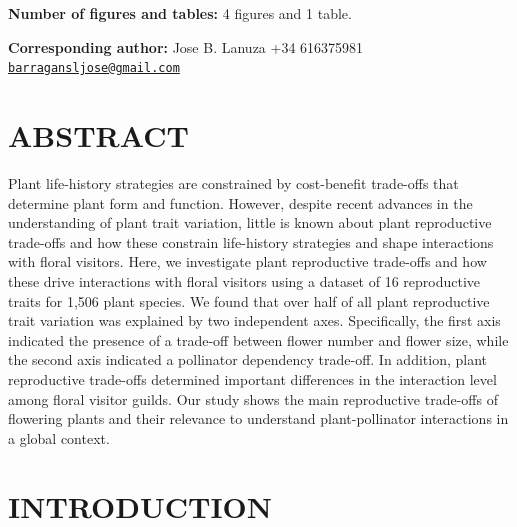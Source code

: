 \documentclass[
  12pt,
  a4paper,
]{article}
\begin{document}
\textbf{Number of figures and tables:} 4 figures and 1 table.

\textbf{Corresponding author:} Jose B. Lanuza \textbar{} +34 616375981\textbar{} \href{mailto:barragansljose@gmail.com}{\nolinkurl{barragansljose@gmail.com}}

\newpage

\hypertarget{abstract}{%
\section{ABSTRACT}\label{abstract}}

Plant life-history strategies are constrained by cost-benefit trade-offs that determine plant form and function. However, despite recent advances in the understanding of plant trait variation, little is known about plant reproductive trade-offs and how these constrain life-history strategies and shape interactions with floral visitors. Here, we investigate plant reproductive trade-offs and how these drive interactions with floral visitors using a dataset of 16 reproductive traits for 1,506 plant species. We found that over half of all plant reproductive trait variation was explained by two independent axes. Specifically, the first axis indicated the presence of a trade-off between flower number and flower size, while the second axis indicated a pollinator dependency trade-off. In addition, plant reproductive trade-offs determined important differences in the interaction level among floral visitor guilds. Our study shows the main reproductive trade-offs of flowering plants and their relevance to understand plant-pollinator interactions in a global context.

\newpage

\doublespacing
\vspace{5mm}
\normalsize

\hypertarget{introduction}{%
\section{INTRODUCTION}\label{introduction}}
\end{document}
